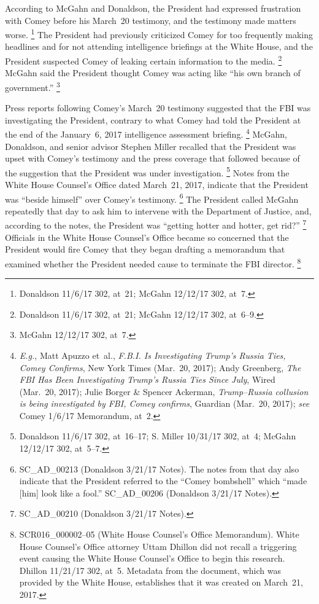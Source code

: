 According to McGahn and Donaldson, the President had expressed frustration with Comey before his March~20 testimony, and the testimony made matters worse.%
\footnote{Donaldson 11/6/17 302, at~21;
McGahn 12/12/17 302, at~7.}
The President had previously criticized Comey for too frequently making headlines and for not attending intelligence briefings at the White House, and the President suspected Comey of leaking certain information to the media.%
\footnote{Donaldson 11/6/17 302, at~21;
McGahn 12/12/17 302, at~6--9.}
McGahn said the President thought Comey was acting like ``his own branch of government.''%
\footnote{McGahn 12/12/17 302, at~7.}

Press reports following Comey's March~20 testimony suggested that the FBI was investigating the President, contrary to what Comey had told the President at the end of the January~6, 2017 intelligence assessment briefing.%
\footnote{\textit{E.g.}, Matt Apuzzo et~al., \textit{F.B.I. Is Investigating Trump's Russia Ties, Comey Confirms}, New York Times (Mar.~20, 2017);
Andy Greenberg, \textit{The FBI Has Been Investigating Trump's Russia Ties Since July}, Wired (Mar.~20, 2017);
Julie Borger \& Spencer Ackerman, \textit{Trump--Russia collusion is being investigated by FBI, Comey confirms}, Guardian (Mar.~20, 2017);
\textit{see} Comey 1/6/17 Memorandum, at~2.}
McGahn, Donaldson, and senior advisor Stephen Miller recalled that the President was upset with Comey's testimony and the press coverage that followed because of the suggestion that the President was under investigation.%
\footnote{Donaldson 11/6/17 302, at~16--17;
S. Miller 10/31/17 302, at~4;
McGahn 12/12/17 302, at~5--7.}
Notes from the White House Counsel's Office dated March~21, 2017, indicate that the President was ``beside himself\thinspace'' over Comey's testimony.%
\footnote{SC\_AD\_00213 (Donaldson 3/21/17 Notes).
The notes from that day also indicate that the President referred to the ``Comey bombshell'' which ``made [him] look like a fool.''
SC\_AD\_00206 (Donaldson 3/21/17 Notes).}
The President called McGahn repeatedly that day to ask him to intervene with the Department of Justice, and, according to the notes, the President was ``getting hotter and hotter, get rid?''%
\footnote{SC\_AD\_00210 (Donaldson 3/21/17 Notes).}
Officials in the White House Counsel's Office became so concerned that the President would fire Comey that they began drafting a memorandum that examined whether the President needed cause to terminate the FBI director.%
\footnote{SCR016\_000002--05 (White House Counsel's Office Memorandum).
White House Counsel's Office attorney Uttam Dhillon did not recall a triggering event causing the White House Counsel's Office to begin this research.
Dhillon 11/21/17 302, at~5.
Metadata from the document, which was provided by the White House, establishes that it was created on March~21, 2017.}

